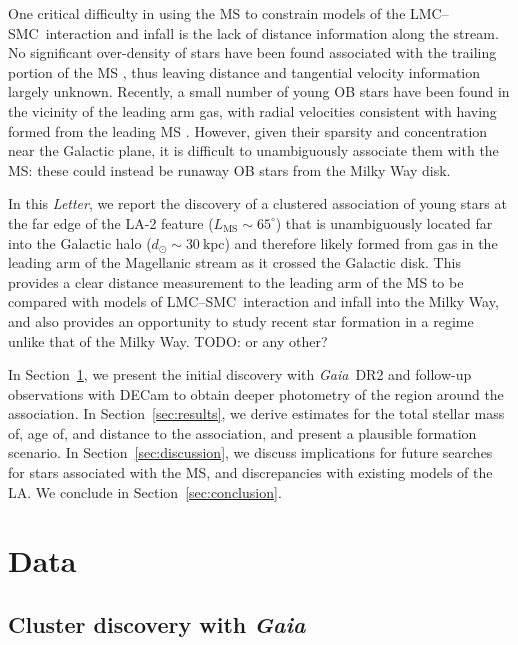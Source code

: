 \documentclass[modern]{aastex62}
\newcommand{\acronym}[1]{{\small{#1}}}
\newcommand{\gaia}{\textsl{Gaia}}
\newcommand{\DR}[1]{\acronym{DR#1}}
\newcommand{\todo}[1]{{\color{red} TODO: #1}}
\newcommand{\articlename}{\textsl{Letter}}
\newcommand{\sectionname}{Section}
\newcommand{\lmcsmc}{LMC--SMC}
\begin{document}
One critical difficulty in using the MS to constrain models of the \lmcsmc\ interaction and infall is the lack of distance information along the stream.
No significant over-density of stars have been found associated with the trailing portion of the MS \citep{Guhathakurta:1998}, thus leaving distance and tangential velocity information largely unknown.
Recently, a small number of young OB stars have been found in the vicinity of the leading arm gas, with radial velocities consistent with having formed from the leading MS \citep{Casetti-Dinescu:2014, Zhang:2017}.
However, given their sparsity and concentration near the Galactic plane, it is difficult to unambiguously associate them with the MS: these could instead be runaway OB stars from the Milky Way disk.

In this \articlename, we report the discovery of a clustered association of young stars at the far edge of the LA-2 feature ($L_{\textrm{MS}} \sim 65^\circ$) that is unambiguously located far into the Galactic halo ($d_\odot \sim 30~\textrm{kpc}$) and therefore likely formed from gas in the leading arm of the Magellanic stream as it crossed the Galactic disk.
This provides a clear distance measurement to the leading arm of the MS to be compared with models of \lmcsmc\ interaction and infall into the Milky Way, and also provides an opportunity to study recent star formation in a regime unlike that of the Milky Way. \todo{or any other?}

In \sectionname~\ref{sec:data}, we present the initial discovery with \gaia\ \DR{2} and follow-up observations with DECam to obtain deeper photometry of the region around the association.
In \sectionname~\ref{sec:results}, we derive estimates for the total stellar mass of, age of, and distance to the association, and present a plausible formation scenario.
In \sectionname~\ref{sec:discussion}, we discuss implications for future searches for stars associated with the MS, and discrepancies with existing models of the LA.
We conclude in \sectionname~\ref{sec:conclusion}.

\section{Data} \label{sec:data}

\subsection{Cluster discovery with \gaia}
\label{sec:discovery}
\end{document}
